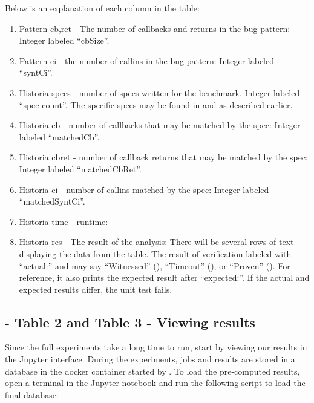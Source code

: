 \documentclass{acmart} %
\begin{document}
Below is an explanation of each column in the table:
\begin{enumerate}
    \item Pattern cb,ret - The number of callbacks and returns in the bug pattern: Integer labeled ``cbSize''.
    \item Pattern ci - the number of callins in the bug pattern: Integer labeled ``syntCi''.
    \item Historia specs - number of specs written for the benchmark.  Integer labeled ``spec count''. The specific specs may be found in  and  as described earlier.
    \item Historia cb - number of callbacks that may be matched by the \newls spec: Integer labeled ``matchedCb''.
    \item Historia cbret - number of callback returns that may be matched by the \newls spec: Integer labeled ``matchedCbRet''.
    \item Historia ci - number of callins matched by the spec: Integer labeled ``matchedSyntCi''.
    \item Historia time - runtime: 
    \item Historia res - The result of the analysis: There will be several rows of text displaying the data from the table.  The result of verification labeled with ``actual:'' and may say ``Witnessed'' (\cAlarm), ``Timeout'' (\cTimeout), or ``Proven'' (\cSafe).  For reference, it also prints the expected result after ``expected:''.  If the actual and expected results differ, the unit test fails.
\end{enumerate}



\subsection{ - Table 2 and Table 3 - Viewing results}

Since the full experiments take a long time to run, start by viewing our results in the Jupyter interface.
During the experiments, jobs and results are stored in a database in the  docker container started by .
To load the pre-computed results, open a terminal in the Jupyter notebook and run the following script to load the final database:
\end{document}
